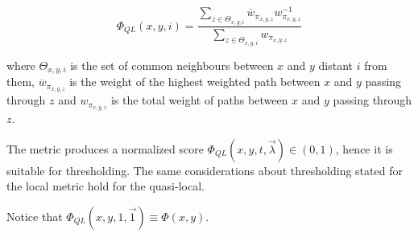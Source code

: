 \begin{equation}
\label{eqn:detection-quasi-local-2}
\Phi_{QL}(x,y,i)=
\frac{\sum\limits_{z\in\Theta_{x,y,i}}\overline{w}_{\pi_{x,y,z}}w_{\pi_{x,y,z}}^{-1}}
{\sum\limits_{z\in\Theta_{x,y,i}}w_{\pi_{x,y,z}}}
\end{equation}

where $\Theta_{x,y,i}$ is the set of common neighbours between $x$ and $y$ distant $i$ from them,
$\overline{w}_{\pi_{x,y,z}}$ is the weight of the highest weighted path between $x$ and $y$ passing through $z$ and
$w_{\pi_{x,y,z}}$ is the total weight of paths between $x$ and $y$ passing through $z$.

The metric produces a normalized score $\Phi_{QL}(x,y,t,\vec{\lambda})\in(0,1)$, hence it is suitable for thresholding. The same considerations about thresholding stated for the local metric hold for the quasi-local.

Notice that $\Phi_{QL}(x,y,1,\vec{1})\equiv\Phi(x,y)$.



